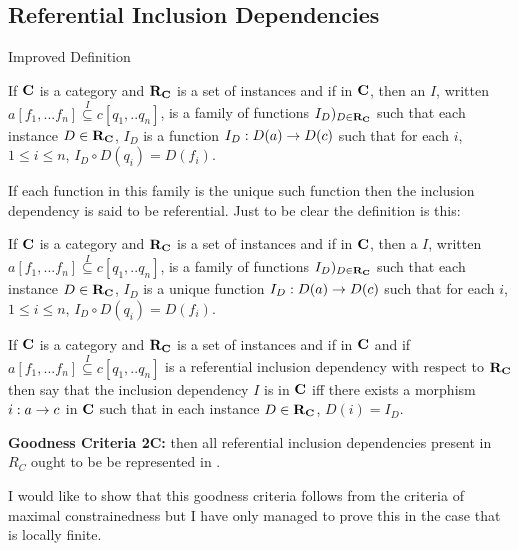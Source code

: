 \documentclass[xcolor=pst,dvips]{beamer}
\begin{document}
\subsection{Referential Inclusion Dependencies}
\begin{frame} {Improved Definition}
\begin{definition}
If $\textbf{C}$ is a category and $\textbf{R}_{\textbf{C}}$ is a set of instances 
and if
\fnsourceqnsource
in $\textbf{C}$, then an  $I$, written $a[f_1,...f_n] \overset{I}{\subseteq} c[q_1,..q_n]$, is a family of functions $I_D)_{D \in \textbf{R}_{\textbf{C}}}$
such that each instance $D \in \textbf{R}_{\textbf{C}}$, $I_D$ is a function $I_D : D(a) \rightarrow D(c)$ such that
for each $i$, $1 \leq i \le n$, $I_D \circ D(q_i) = D(f_i)$.
\end{definition}

If each function in this family is the unique such function then the inclusion dependency is said to be referential. Just to be clear the definition is this:
\end{frame}

\begin{frame}
\begin{definition}
If $\textbf{C}$ is a category and $\textbf{R}_{\textbf{C}}$ is a set of instances 
and if
\fnsourceqnsource
in $\textbf{C}$, then a  $I$, written $a[f_1,...f_n] \overset{I}{\subseteq} c[q_1,..q_n]$, is a family of functions $I_D)_{D \in \textbf{R}_{\textbf{C}}}$
such that each instance $D \in \textbf{R}_{\textbf{C}}$, $I_D$ is a unique function $I_D : D(a) \rightarrow D(c)$ such that
for each $i$, $1 \leq i \le n$, $I_D \circ D(q_i) = D(f_i)$.
\end{definition}
\end{frame}

\begin{frame}
\begin{definition}
If $\textbf{C}$ is a category and $\textbf{R}_{\textbf{C}}$ is a set of instances and if
\fnsourceqnsource
in $\textbf{C}$ and if $a[f_1,...f_n] \overset{I}{\subseteq} c[q_1,..q_n]$ is a referential inclusion dependency
with respect  to $\textbf{R}_{\textbf{C}}$ then say that the inclusion dependency $I$ is  in $\textbf{C}$
iff there exists a morphism $i:a \rightarrow c$ in $\textbf{C}$ such that in each instance $D \in \textbf{R}_{\textbf{C}}$, $D(i) = I_D$. 
\end{definition}
\end{frame}

\begin{frame}
\textbf {Goodness Criteria 2C:} \IfSforCwithRCwords 
then all referential inclusion dependencies present in $R_C$
ought to be be represented in \catc.

I would like to show that this goodness criteria follows from the criteria of maximal constrainedness
but I have only managed to prove this in the case that \catcw is locally finite.
\end{frame}
\end{document}
